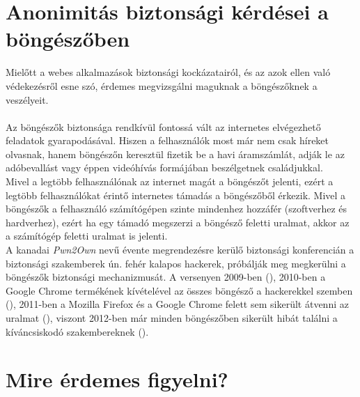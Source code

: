 
\section{Anonimitás biztonsági kérdései a böngészőben} %
\label{sect:anonimitás_biztonsági_kérdései_a_böngészőben}
Mielőtt a webes alkalmazások biztonsági kockázatairól, és az azok ellen való védekezésről esne szó, érdemes megvizsgálni maguknak a böngészőknek a veszélyeit.\hfill\\
\\
Az böngészők biztonsága rendkívül fontossá vált az internetes elvégezhető feladatok gyarapodásával. Hiszen a felhasználók most már nem csak híreket olvasnak, hanem böngészőn keresztül fizetik be a havi áramszámlát, adják le az adóbevallást vagy éppen videóhívás formájában beszélgetnek családjukkal.\hfill\\
Mivel a legtöbb felhasználónak az internet magát a böngészőt jelenti, ezért a legtöbb felhasználókat érintő internetes támadás a böngészőből érkezik. Mivel a böngészők a felhasználó számítógépen szinte mindenhez hozzáfér (szoftverhez és hardverhez), ezért ha egy támadó megszerzi a böngésző feletti uralmat, akkor az a számítógép feletti uralmat is jelenti.\hfill\\
A kanadai \textit{Pwn2Own} nevű évente megrendezésre kerülő biztonsági konferencián a biztonsági szakemberek ún. fehér kalapos hackerek, próbálják meg megkerülni a böngészők biztonsági mechanizmusát. A versenyen 2009-ben (\cite{buhera_pwn2own_2009}), 2010-ben a Google Chrome termékének kívételével az összes böngésző a hackerekkel szemben (\cite{buhera_pwn2own_2010}), 2011-ben a Mozilla Firefox és a Google Chrome felett sem sikerült átvenni az uralmat (\cite{buhera_pwn2own_2011}), viszont 2012-ben már minden böngészőben sikerült hibát találni a kíváncsiskodó szakembereknek (\cite{buhera_pwn2own_2012}).

\section{Mire érdemes figyelni?} %
\label{sec:mire_érdemes_figyelni__}

